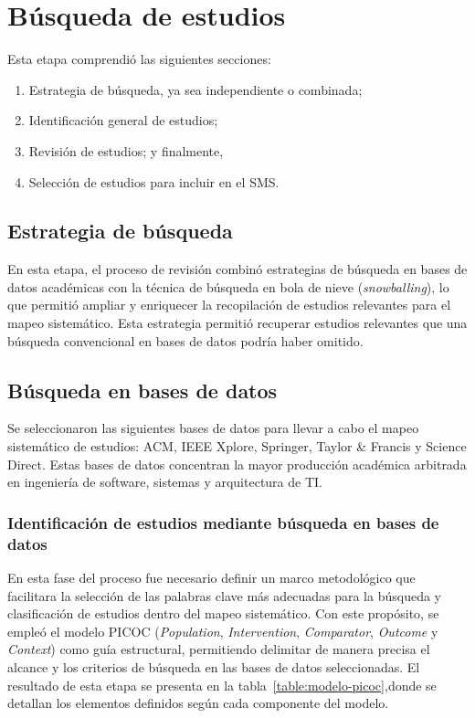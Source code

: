 \newpage \section{Búsqueda de estudios}


Esta etapa comprendió las siguientes secciones:
\begin{enumerate}
	\item Estrategia de búsqueda, ya sea independiente o combinada;
	\item Identificación general de estudios;
	\item Revisión de estudios; y finalmente,
	\item Selección de estudios para incluir en el SMS.\@
\end{enumerate}

\subsection{Estrategia de búsqueda}

En esta etapa, el proceso de revisión combinó estrategias de búsqueda en bases de datos académicas con la técnica de búsqueda en bola de nieve (\textit{snowballing}), lo que permitió ampliar y enriquecer la recopilación de estudios relevantes para el mapeo sistemático. Esta estrategia permitió recuperar estudios relevantes que una búsqueda convencional en bases de datos podría haber omitido.

\subsection{Búsqueda en bases de datos}\label{subsec:busquedaBasesDatos}
Se seleccionaron las siguientes bases de datos para llevar a cabo el mapeo sistemático de estudios: ACM, IEEE Xplore, Springer, Taylor \& Francis y Science Direct. Estas bases de datos concentran la mayor producción académica arbitrada en ingeniería de software, sistemas y arquitectura de TI.


\newpage
\subsubsection{Identificación de estudios mediante búsqueda en bases de datos}\label{subsubsec:identificacionEstudios}
En esta fase del proceso fue necesario definir un marco metodológico que facilitara la selección de las palabras clave más adecuadas para la búsqueda y clasificación de estudios dentro del mapeo sistemático. Con este propósito, se empleó el modelo PICOC (\textit{Population}, \textit{Intervention}, \textit{Comparator}, \textit{Outcome} y \textit{Context}) como guía estructural, permitiendo delimitar de manera precisa el alcance y los criterios de búsqueda en las bases de datos seleccionadas. El resultado de esta etapa se presenta en la tabla~\ref{table:modelo-picoc},donde se detallan los elementos definidos según cada componente del modelo.

